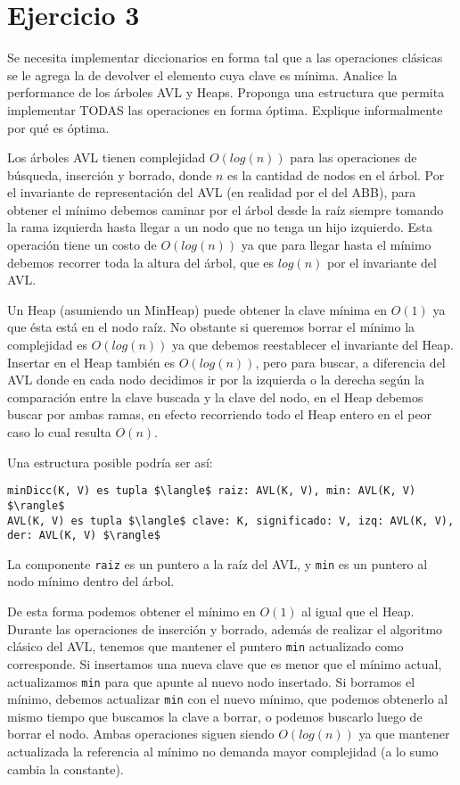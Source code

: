 \section*{Ejercicio 3}

Se necesita implementar diccionarios en forma tal que a las operaciones clásicas se le agrega la de devolver el elemento cuya clave es mínima. Analice la performance de los árboles AVL y Heaps. Proponga una estructura que permita implementar TODAS las operaciones en forma óptima. Explique informalmente por qué es óptima.

Los árboles AVL tienen complejidad $O(log(n))$ para las operaciones de búsqueda, inserción y borrado, donde $n$ es la cantidad de nodos en el árbol. Por el invariante de representación del AVL (en realidad por el del ABB), para obtener el mínimo debemos caminar por el árbol desde la raíz siempre tomando la rama izquierda hasta llegar a un nodo que no tenga un hijo izquierdo. Esta operación tiene un costo de $O(log(n))$ ya que para llegar hasta el mínimo debemos recorrer toda la altura del árbol, que es $log(n)$ por el invariante del AVL.

Un Heap (asumiendo un MinHeap) puede obtener la clave mínima en $O(1)$ ya que ésta está en el nodo raíz. No obstante si queremos borrar el mínimo la complejidad es $O(log(n))$ ya que debemos reestablecer el invariante del Heap. Insertar en el Heap también es $O(log(n))$, pero para buscar, a diferencia del AVL donde en cada nodo decidimos ir por la izquierda o la derecha según la comparación entre la clave buscada y la clave del nodo, en el Heap debemos buscar por ambas ramas, en efecto recorriendo todo el Heap entero en el peor caso lo cual resulta $O(n)$.

Una estructura posible podría ser así:

\begin{lstlisting}
minDicc(K, V) es tupla $\langle$ raiz: AVL(K, V), min: AVL(K, V) $\rangle$
AVL(K, V) es tupla $\langle$ clave: K, significado: V, izq: AVL(K, V), der: AVL(K, V) $\rangle$
\end{lstlisting}

La componente \lstinline{raiz} es un puntero a la raíz del AVL, y \lstinline{min} es un puntero al nodo mínimo dentro del árbol.

De esta forma podemos obtener el mínimo en $O(1)$ al igual que el Heap. Durante las operaciones de inserción y borrado, además de realizar el algoritmo clásico del AVL, tenemos que mantener el puntero \lstinline{min} actualizado como corresponde. Si insertamos una nueva clave que es menor que el mínimo actual, actualizamos \lstinline{min} para que apunte al nuevo nodo insertado. Si borramos el mínimo, debemos actualizar \lstinline{min} con el nuevo mínimo, que podemos obtenerlo al mismo tiempo que buscamos la clave a borrar, o podemos buscarlo luego de borrar el nodo. Ambas operaciones siguen siendo $O(log(n))$ ya que mantener actualizada la referencia al mínimo no demanda mayor complejidad (a lo sumo cambia la constante).
